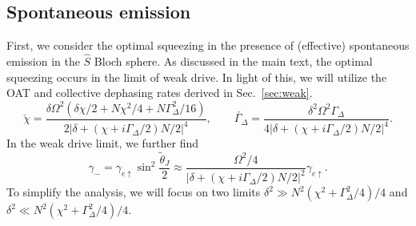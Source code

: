 \subsection{Spontaneous emission}
\label{sec:SE}

First, we consider the optimal squeezing in the presence of (effective) spontaneous emission in the $\hat S$ Bloch sphere. As discussed in the main text, the optimal squeezing occurs in the limit of weak drive. In light of this, we will utilize the OAT and collective dephasing rates derived in Sec.~\ref{sec:weak}. 
\begin{equation}
    \check{\chi} = \frac{\delta \Omega^2 (\delta \chi/2 + N \chi^2/4 + N \Gamma_\Delta^2/16)}{2 |\delta + (\chi + i \Gamma_\Delta/2)N/2|^4}, \qquad \check{\Gamma_\Delta} = \frac{\delta^2 \Omega^2 \Gamma_\Delta}{4 |\delta + (\chi + i \Gamma_\Delta/2)N/2|^4}.
\end{equation}
In the weak drive limit, we further find
\begin{equation}
    \gamma_- = \gamma_{e \uparrow} \sin^2 \frac{\tilde{\theta}_J}{2} \approx \frac{\Omega^2/4}{|\delta + (\chi + i \Gamma_\Delta/2)N/2|^2} \gamma_{e \uparrow}.
\end{equation}
To simplify the analysis, we will focus on two limits $\delta^2 \gg N^2 (\chi^2 + \Gamma_\Delta^2/4)/4$ and $\delta^2 \ll N^2 (\chi^2 + \Gamma_\Delta^2/4)/4$.

